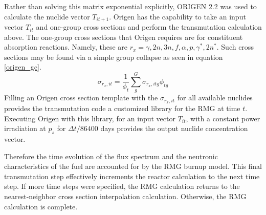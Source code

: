Rather than solving this matrix exponential explicitly, ORIGEN 2.2 \cite{Croff2002} was used 
to calculate the nuclide vector $T_{it+1}$.  Origen has the capability to take an input vector 
$T_{it}$ and one-group cross sections and perform the transmutation calculation above.  The one-group 
cross sections that Origen requires are for constituent absorption reactions.  Namely, these are 
$r_x = \gamma, 2n, 3n, f, \alpha, p, \gamma^*, 2n^*$.  Such cross sections may be found via 
a simple group collapse as seen in equation \ref{origen_gc}.
\begin{equation}
\label{origen_gc}
\sigma_{r_x,it} = \frac{1}{\phi_t} \sum_g^G \sigma_{r_x,itg} \phi_{tg}
\end{equation}
Filling an Origen cross section template with the $\sigma_{r_x,it}$ for all available nuclides
provides the transmutation code a customized library for the RMG at time $t$.  Executing Origen
with this library, for an input vector $T_{it}$, with a constant power irradiation at $p_s$ for
$\Delta t / 86400$ days provides the output nuclide concentration vector.

Therefore the
time evolution of the flux spectrum and the neutronic characteristics of the fuel are accounted
for by the RMG burnup model.  This final transmutation step effectively increments the reactor
calculation to the next time step.  If more time steps were specified, the RMG calculation returns
to the nearest-neighbor cross section interpolation calculation.  Otherwise, the RMG calculation is
complete.


